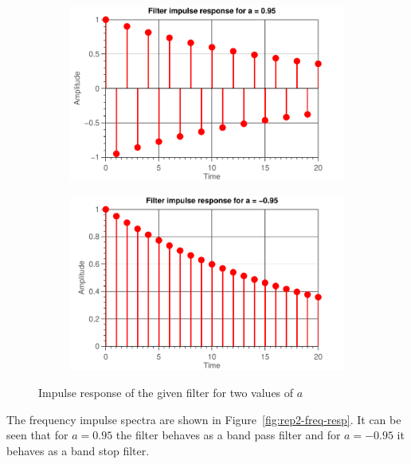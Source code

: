 \documentclass[11pt,titlepage]{report}
\begin{document}
\begin{figure}[H]
	\centering
	\begin{subfigure}{0.49\textwidth}
		\includegraphics[width=\textwidth]{../../deliverable-7-resources/figures/ass-1/report-2/ass-1-report-2-a-positive.pdf}
	\end{subfigure}
	\begin{subfigure}{0.49\textwidth}
		\includegraphics[width=\textwidth]{../../deliverable-7-resources/figures/ass-1/report-2/ass-1-report-2-a-negative.pdf}
	\end{subfigure}
	\caption{Impulse response of the given filter for two values of $a$}
	\label{fig:rep2-time-resp}
\end{figure}

The frequency impulse spectra are shown in Figure~\ref{fig:rep2-freq-resp}. It can be seen that for $a=0.95$ the filter behaves as a band pass filter and for $a=-0.95$ it behaves as a band stop filter. %
\end{document}
